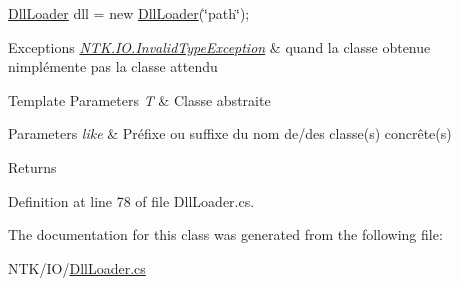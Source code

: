 {\ttfamily  \mbox{\hyperlink{class_n_t_k_1_1_i_o_1_1_dll_loader}{Dll\+Loader}} dll = new \mbox{\hyperlink{class_n_t_k_1_1_i_o_1_1_dll_loader}{Dll\+Loader}}(\char`\"{}path\char`\"{}); } 
\begin{DoxyExceptions}{Exceptions}
{\em \mbox{\hyperlink{class_n_t_k_1_1_i_o_1_1_invalid_type_exception}{N\+T\+K.\+I\+O.\+Invalid\+Type\+Exception}}} & quand la classe obtenue n\textquotesingle{}implémente pas la classe attendu\\
\hline
\end{DoxyExceptions}

\begin{DoxyTemplParams}{Template Parameters}
{\em T} & Classe abstraite\\
\hline
\end{DoxyTemplParams}

\begin{DoxyParams}{Parameters}
{\em like} & Préfixe ou suffixe du nom de/des classe(s) concrête(s)\\
\hline
\end{DoxyParams}
\begin{DoxyReturn}{Returns}

\end{DoxyReturn}


Definition at line 78 of file Dll\+Loader.\+cs.



The documentation for this class was generated from the following file\+:\begin{DoxyCompactItemize}
\item 
N\+T\+K/\+I\+O/\mbox{\hyperlink{_dll_loader_8cs}{Dll\+Loader.\+cs}}\end{DoxyCompactItemize}
